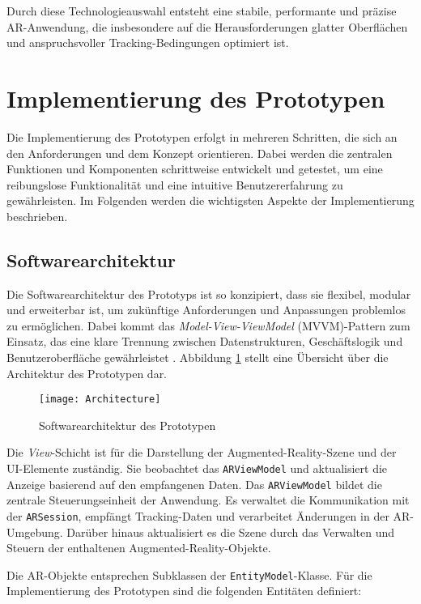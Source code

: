 Durch diese Technologieauswahl entsteht eine stabile, performante und präzise AR-Anwendung, die insbesondere auf die Herausforderungen glatter Oberflächen und anspruchsvoller Tracking-Bedingungen optimiert ist.

\section{Implementierung des Prototypen}

Die Implementierung des Prototypen erfolgt in mehreren Schritten, die sich an den Anforderungen und dem Konzept orientieren. Dabei werden die zentralen Funktionen und Komponenten schrittweise entwickelt und getestet, um eine reibungslose Funktionalität und eine intuitive Benutzererfahrung zu gewährleisten. Im Folgenden werden die wichtigsten Aspekte der Implementierung beschrieben.

\subsection{Softwarearchitektur}

Die Softwarearchitektur des Prototyps ist so konzipiert, dass sie flexibel, modular und erweiterbar ist, um zukünftige Anforderungen und Anpassungen problemlos zu ermöglichen. Dabei kommt das \emph{Model-View-ViewModel} (MVVM)-Pattern zum Einsatz, das eine klare Trennung zwischen Datenstrukturen, Geschäftslogik und Benutzeroberfläche gewährleistet \cite{wikipedia2024mvvm}. Abbildung \ref{fig:Architecture} stellt eine Übersicht über die Architektur des Prototypen dar.

\begin{figure}[ht]
    \centering
    \texttt{[image: Architecture]}
    \caption{Softwarearchitektur des Prototypen}
    \label{fig:Architecture}
\end{figure}

Die \emph{View}-Schicht ist für die Darstellung der Augmented-Reality-Szene und der UI-Elemente zuständig. Sie beobachtet das \texttt{ARViewModel} und aktualisiert die Anzeige basierend auf den empfangenen Daten. Das \texttt{ARViewModel} bildet die zentrale Steuerungseinheit der Anwendung. Es verwaltet die Kommunikation mit der \texttt{ARSession}, empfängt Tracking-Daten und verarbeitet Änderungen in der AR-Umgebung. Darüber hinaus aktualisiert es die Szene durch das Verwalten und Steuern der enthaltenen Augmented-Reality-Objekte.

Die AR-Objekte entsprechen Subklassen der \texttt{EntityModel}-Klasse. Für die Implementierung des Prototypen sind die folgenden Entitäten definiert:

